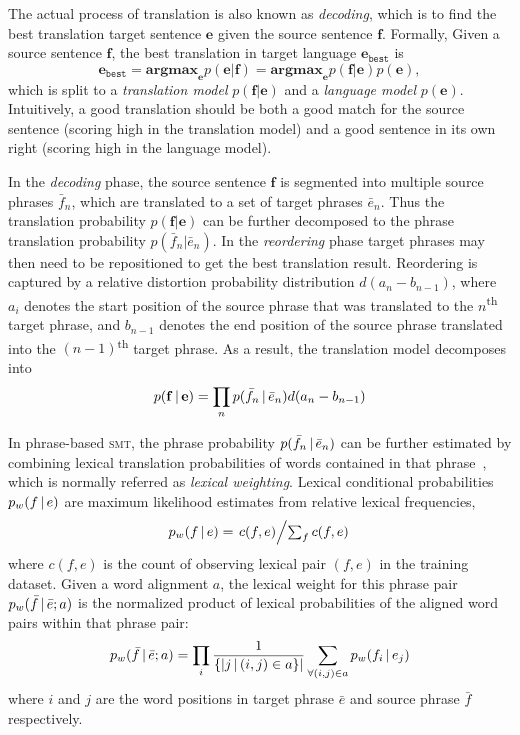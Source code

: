 The actual process of translation is also known as \textit{decoding},
which is to find the best translation target sentence $\mathbf{e}$ 
given the source sentence $\mathbf{f}$. Formally,
Given a source sentence $\mathbf{f}$, the best
translation in target language $\mathbf{e}_\texttt{best}$ is
\begin{equation}
\mathbf{e}_\texttt{best} = \textbf{argmax}_\mathbf{e} p(\mathbf{e}|\mathbf{f}) = \textbf{argmax}_\mathbf{e} p(\mathbf{f}|\mathbf{e}) p (\mathbf{e}),
\end{equation}
which is split to a \textit{translation model}
$p(\mathbf{f}|\mathbf{e})$ and a \textit{language model} $p
(\mathbf{e})$.
Intuitively, a good translation should be both a good match for the source sentence (scoring high in the translation model) 
and a good sentence in its own right (scoring high in the language model).

In the \textit{decoding} phase, the source sentence $\mathbf{f}$ is segmented into multiple source
phrases $\bar{f}_n$, which are translated to a set
of target phrases $\bar{e}_n$. Thus the translation probability
$p(\mathbf{f}|\mathbf{e})$ can be further decomposed to the phrase
translation probability $p(\bar{f}_n | \bar{e}_n)$.
In the \textit{reordering} phase target phrases may then need to be repositioned to get the best
translation result. Reordering is captured by a relative distortion
probability distribution $d(a_n - b_{n-1})$, where $a_i$ denotes the
start position of the source phrase that was translated to the $n$\textsuperscript{th}
target phrase, and $b_{n-1}$ denotes the end position of the source
phrase translated into the $(n-1)$\textsuperscript{th} target phrase. As a result, the
translation model decomposes into
\begin{equation}
p(\mathbf{f} \, | \, \mathbf{e}) = \prod_{n} p(\bar{f}_n \, | \, \bar{e}_n) d(a_n - b_{n-1})
\end{equation}

In phrase-based \textsc{smt}, the phrase probability $p(\bar{f}_n \, | \,
\bar{e}_n)$ can be further estimated by combining lexical translation
probabilities of words contained in that phrase~\citep{koehn-03},
which is normally referred as \textit{lexical weighting}. Lexical
conditional probabilities $p_w(f \, | \, e)$ are maximum likelihood estimates
from relative lexical frequencies,
\begin{equation}
\label{eq:lexical_prob}
p_w(f \, | \, e) = \textstyle \left.c(f, e)\middle/\sum_f{c(f, e)}\right.
\end{equation}
where $c(f, e)$ is the count of observing lexical pair $(f, e)$ in the
training dataset. Given a word alignment $a$, the lexical weight for
this phrase pair $p_w(\bar{f} \, | \, \bar{e}; a)$ is the normalized product
of lexical probabilities of the aligned word pairs within that phrase
pair:
\begin{equation}
\label{eq:phrase_prob}
p_w(\bar{f} \, | \, \bar{e}; a) = \prod_{i} \frac{1}{\{|j \, | \, (i, j) \in a\}|} \sum_{\forall (i,j) \in a} p_w(f_i \, | \, e_j)
\end{equation}
where $i$ and $j$ are the word positions in target phrase $\bar{e}$
and source phrase $\bar{f}$ respectively.

